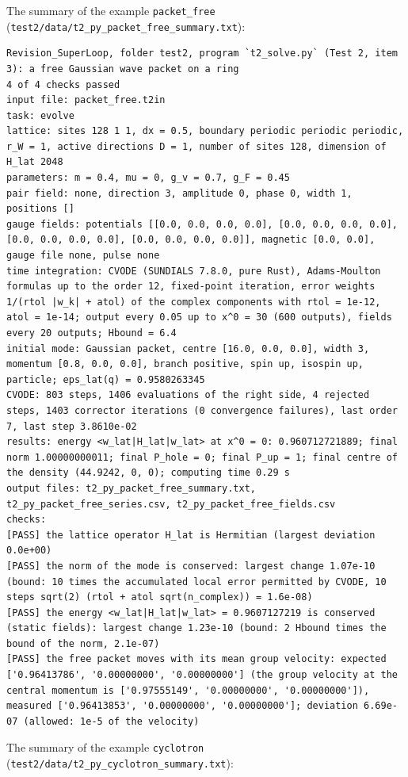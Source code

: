 \documentclass[
  10pt,
]{article}
\begin{document}
The summary of the example \texttt{packet\_free}
(\texttt{test2/data/t2\_py\_packet\_free\_summary.txt}):

\begin{verbatim}
Revision_SuperLoop, folder test2, program `t2_solve.py` (Test 2, item 3): a free Gaussian wave packet on a ring
4 of 4 checks passed
input file: packet_free.t2in
task: evolve
lattice: sites 128 1 1, dx = 0.5, boundary periodic periodic periodic, r_W = 1, active directions D = 1, number of sites 128, dimension of H_lat 2048
parameters: m = 0.4, mu = 0, g_v = 0.7, g_F = 0.45
pair field: none, direction 3, amplitude 0, phase 0, width 1, positions []
gauge fields: potentials [[0.0, 0.0, 0.0, 0.0], [0.0, 0.0, 0.0, 0.0], [0.0, 0.0, 0.0, 0.0], [0.0, 0.0, 0.0, 0.0]], magnetic [0.0, 0.0], gauge file none, pulse none
time integration: CVODE (SUNDIALS 7.8.0, pure Rust), Adams-Moulton formulas up to the order 12, fixed-point iteration, error weights 1/(rtol |w_k| + atol) of the complex components with rtol = 1e-12, atol = 1e-14; output every 0.05 up to x^0 = 30 (600 outputs), fields every 20 outputs; Hbound = 6.4
initial mode: Gaussian packet, centre [16.0, 0.0, 0.0], width 3, momentum [0.8, 0.0, 0.0], branch positive, spin up, isospin up, particle; eps_lat(q) = 0.9580263345
CVODE: 803 steps, 1406 evaluations of the right side, 4 rejected steps, 1403 corrector iterations (0 convergence failures), last order 7, last step 3.8610e-02
results: energy <w_lat|H_lat|w_lat> at x^0 = 0: 0.960712721889; final norm 1.00000000011; final P_hole = 0; final P_up = 1; final centre of the density (44.9242, 0, 0); computing time 0.29 s
output files: t2_py_packet_free_summary.txt, t2_py_packet_free_series.csv, t2_py_packet_free_fields.csv
checks:
[PASS] the lattice operator H_lat is Hermitian (largest deviation 0.0e+00)
[PASS] the norm of the mode is conserved: largest change 1.07e-10 (bound: 10 times the accumulated local error permitted by CVODE, 10 steps sqrt(2) (rtol + atol sqrt(n_complex)) = 1.6e-08)
[PASS] the energy <w_lat|H_lat|w_lat> = 0.9607127219 is conserved (static fields): largest change 1.23e-10 (bound: 2 Hbound times the bound of the norm, 2.1e-07)
[PASS] the free packet moves with its mean group velocity: expected ['0.96413786', '0.00000000', '0.00000000'] (the group velocity at the central momentum is ['0.97555149', '0.00000000', '0.00000000']), measured ['0.96413853', '0.00000000', '0.00000000']; deviation 6.69e-07 (allowed: 1e-5 of the velocity)
\end{verbatim}

The summary of the example \texttt{cyclotron}
(\texttt{test2/data/t2\_py\_cyclotron\_summary.txt}):
\end{document}
